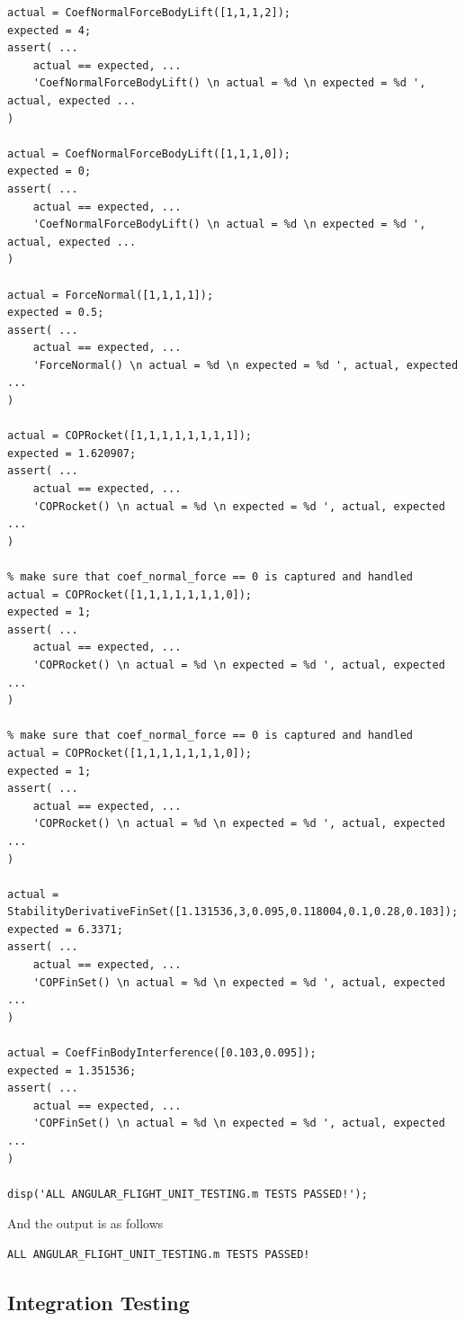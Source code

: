 \documentclass[]{article}
\begin{document}
\begin{verbatim}
actual = CoefNormalForceBodyLift([1,1,1,2]);
expected = 4;
assert( ...
    actual == expected, ...
    'CoefNormalForceBodyLift() \n actual = %d \n expected = %d ', actual, expected ...
)

actual = CoefNormalForceBodyLift([1,1,1,0]);
expected = 0;
assert( ...
    actual == expected, ...
    'CoefNormalForceBodyLift() \n actual = %d \n expected = %d ', actual, expected ...
)

actual = ForceNormal([1,1,1,1]);
expected = 0.5;
assert( ...
    actual == expected, ...
    'ForceNormal() \n actual = %d \n expected = %d ', actual, expected ...
)

actual = COPRocket([1,1,1,1,1,1,1,1]);
expected = 1.620907;
assert( ...
    actual == expected, ...
    'COPRocket() \n actual = %d \n expected = %d ', actual, expected ...
)

% make sure that coef_normal_force == 0 is captured and handled
actual = COPRocket([1,1,1,1,1,1,1,0]);
expected = 1;
assert( ...
    actual == expected, ...
    'COPRocket() \n actual = %d \n expected = %d ', actual, expected ...
)

% make sure that coef_normal_force == 0 is captured and handled
actual = COPRocket([1,1,1,1,1,1,1,0]);
expected = 1;
assert( ...
    actual == expected, ...
    'COPRocket() \n actual = %d \n expected = %d ', actual, expected ...
)

actual = StabilityDerivativeFinSet([1.131536,3,0.095,0.118004,0.1,0.28,0.103]);
expected = 6.3371;
assert( ...
    actual == expected, ...
    'COPFinSet() \n actual = %d \n expected = %d ', actual, expected ...
)

actual = CoefFinBodyInterference([0.103,0.095]);
expected = 1.351536;
assert( ...
    actual == expected, ...
    'COPFinSet() \n actual = %d \n expected = %d ', actual, expected ...
)

disp('ALL ANGULAR_FLIGHT_UNIT_TESTING.m TESTS PASSED!');
\end{verbatim}

And the output is as follows

\begin{verbatim}
ALL ANGULAR_FLIGHT_UNIT_TESTING.m TESTS PASSED!
\end{verbatim}

\clearpage 

\subsection{Integration Testing}\label{integration-testing}
\end{document}
